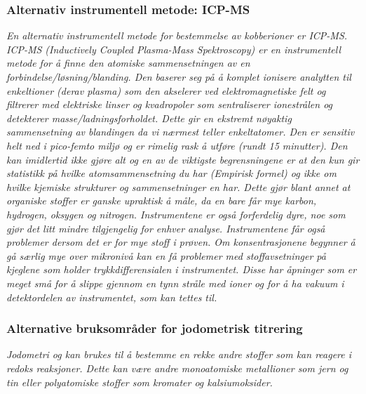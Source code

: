 \subsubsection{Alternativ instrumentell metode: ICP-MS}
\textit{En alternativ instrumentell metode for bestemmelse av kobberioner er ICP-MS\cite{ICPMSCopper}\cite{ICPMSCopper2}. ICP-MS (Inductively Coupled Plasma-Mass Spektroscopy) er en instrumentell metode for å finne den atomiske sammensetningen av en forbindelse/løsning/blanding. Den baserer seg på å komplet ionisere analytten til enkeltioner (derav plasma) som den akselerer ved elektromagnetiske felt og filtrerer med elektriske linser og kvadropoler som sentraliserer ionestrålen og detekterer masse/ladningsforholdet. Dette gir en ekstremt nøyaktig sammensetning av blandingen da vi nærmest teller enkeltatomer. Den er sensitiv helt ned i pico-femto miljø og er rimelig rask å utføre (rundt 15 minutter). Den kan imidlertid ikke gjøre alt og en av de viktigste begrensningene er at den kun gir statistikk på hvilke atomsammensetning du har (Empirisk formel) og ikke om hvilke kjemiske strukturer og sammensetninger en har. Dette gjør blant annet at organiske stoffer er ganske upraktisk å måle, da en bare får mye karbon, hydrogen, oksygen og nitrogen. Instrumentene er også forferdelig dyre, noe som gjør det litt mindre tilgjengelig for enhver analyse. Instrumentene får også problemer dersom det er for mye stoff i prøven. Om konsentrasjonene begynner å gå særlig mye over mikronivå kan en få problemer med stoffavsetninger på kjeglene som holder trykkdifferensialen i instrumentet. Disse har åpninger som er meget små for å slippe gjennom en tynn stråle med ioner og for å ha vakuum i detektordelen av instrumentet, som kan tettes til.}

\subsubsection{Alternative bruksområder for jodometrisk titrering}

\textit{Jodometri og kan brukes til å bestemme en rekke andre stoffer som kan reagere i redoks reaksjoner. Dette kan være andre monoatomiske metallioner som jern\cite{IodimetryIron} og tin\cite{IodometryTin} eller polyatomiske stoffer som kromater\cite{IodimetryChromate} og kalsiumoksider\cite{IodometryCalciumOx}.}
